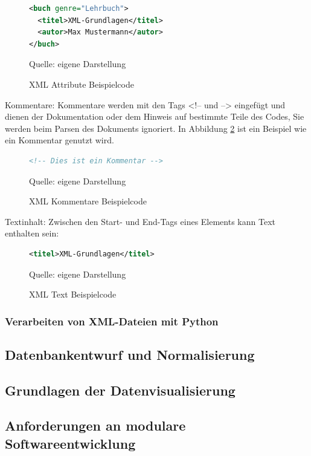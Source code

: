 \begin{figure}[H]
\centering
\begin{minipage}{0.95\textwidth}
\begin{lstlisting}[language=XML]
<buch genre="Lehrbuch">
  <titel>XML-Grundlagen</titel>
  <autor>Max Mustermann</autor>
</buch>
\end{lstlisting}
\end{minipage}
\caption{XML Attribute Beispielcode}
\label{fig:XML Attribute Beispielcode}
    {Quelle: eigene Darstellung}
\end{figure}

Kommentare: Kommentare werden mit den Tags <!-- und --> eingefügt und dienen der Dokumentation oder dem Hinweis auf bestimmte Teile des Codes,
Sie werden beim Parsen des Dokuments ignoriert. In Abbildung \ref{fig:XML Kommentare Beispielcode} ist ein Beispiel wie
ein Kommentar genutzt wird.

\begin{figure}[H]
\centering
\begin{minipage}{0.95\textwidth}
\begin{lstlisting}[language=XML]
<!-- Dies ist ein Kommentar -->
\end{lstlisting}
\end{minipage}
\caption{XML Kommentare Beispielcode}
\label{fig:XML Kommentare Beispielcode}
    {Quelle: eigene Darstellung}
\end{figure}

Textinhalt: Zwischen den Start- und End-Tags eines Elements kann Text enthalten sein:

\begin{figure}[H]
\centering
\begin{minipage}{0.95\textwidth}
\begin{lstlisting}[language=XML]
<titel>XML-Grundlagen</titel>
\end{lstlisting}
\end{minipage}
\caption{XML Text Beispielcode}
\label{fig:XML Text Beispielcode}
    {Quelle: eigene Darstellung}
\end{figure}

\subsubsection{Verarbeiten von XML-Dateien mit Python}

\pagebreak
\subsection{Datenbankentwurf und Normalisierung}

\subsection{Grundlagen der Datenvisualisierung}

\subsection{Anforderungen an modulare Softwareentwicklung}